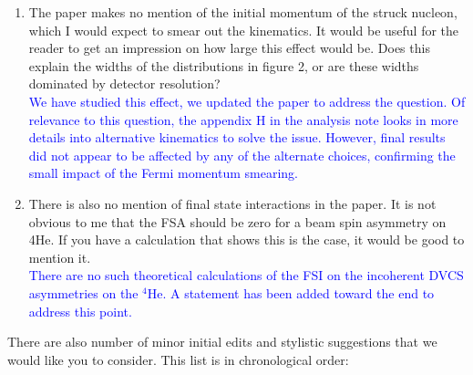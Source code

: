 \documentclass[a4paper,11pt,twoside]{article}
\begin{document}
\begin{enumerate}
\item  The paper makes no mention of the initial momentum of the struck 
   nucleon, which I would expect to smear out the kinematics. It would be 
      useful for the reader to get an impression on how large this effect would 
      be. Does this explain the widths of the distributions in figure 2, or are 
      these widths dominated by detector resolution?\\
   \textcolor{blue}{We have studied this effect, we updated the paper to
      address the question. Of relevance to this question, the appendix H in the analysis note 
      looks in more details into alternative kinematics to solve the issue. However,
      final results did not appear to be affected by any of the alternate choices,
      confirming the small impact of the Fermi momentum smearing.}

\item  There is also no mention of final state interactions in the paper. It is 
   not obvious to me that the FSA should be zero for a beam spin asymmetry on 
      4He. If you have a calculation that shows this is the case, it would be 
      good to mention it.\\
   \textcolor{blue}{There are no such theoretical calculations of the FSI on 
      the incoherent DVCS asymmetries on the $^4$He. A statement has been added
      toward the end to address this point.}

\end{enumerate}


\newpage
\newpage
\newpage
\newpage

There are also number of minor initial edits and stylistic suggestions that we 
would like you to consider. This list is in chronological order:
\end{document}
